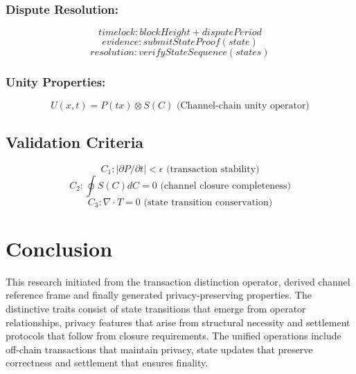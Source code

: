 \documentclass[11pt]{amsart}
\begin{document}
\subsubsection{Dispute Resolution:}
\begin{equation*}
	timelock: blockHeight + disputePeriod
\end{equation*}
\begin{equation*}
	evidence: submitStateProof(state)
\end{equation*}
\begin{equation*}
	resolution: verifyStateSequence(states)
\end{equation*}

\subsubsection{Unity Properties:}
\begin{equation*}
	U(x,t) = P(tx) \otimes S(C) \text{ (Channel-chain unity operator)}
\end{equation*}

\subsection{Validation Criteria}
\begin{equation*}
	C_1: |\partial P/ \partial t| < \epsilon \text{ (transaction stability)}
\end{equation*}
\begin{equation*}
	C_2: \oint S(C)dC = 0 \text{ (channel closure completeness)}
\end{equation*}
\begin{equation*}
	C_3: \nabla \cdot T = 0 \text{ (state transition conservation)}
\end{equation*}

\section{Conclusion}

This research initiated from the transaction distinction operator, derived channel reference frame and finally generated privacy-preserving properties.
The distinctive traits consist of state transitions that emerge from operator relationships, privacy features that arise from structural necessity and settlement protocols that follow from closure requirements. The unified operations include off-chain transactions that maintain privacy, state updates that preserve correctness and settlement that ensures finality.
\end{document}
